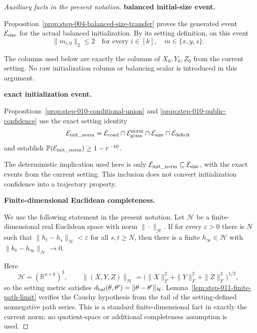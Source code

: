 \begin{proof}[Auxiliary facts in the present notation]


\medskip\noindent\textbf{balanced initial-size event.}\par

Proposition~\ref{prop:step-004-balanced-size-transfer} proves the generated
event \(\mathcal E_{\rm size}\) for the actual balanced initialization. By
its setting definition, on this event
\[
  \|m_{i,0}\|_2\le2
  \quad\text{for every }i\in[k],\quad m\in\{x,y,z\}.
\]

The columns used below are exactly the columns of \(X_0,Y_0,Z_0\) from the
current setting. No raw initialization column or balancing scalar is
introduced in this argument.


\medskip\noindent\textbf{exact initialization event.}\par

Propositions~\ref{prop:step-010-conditional-union} and
\ref{prop:step-010-public-confidence} use the exact setting identity
\[
  \mathcal E_{\rm init\_norm}
  =\mathcal E_{\rm cond}\cap\mathcal E_{\rm gram}^{\rm norm}
   \cap\mathcal E_{\rm size}\cap\mathcal E_{\rm deficit}
\]
and establish \(\mathbb P(\mathcal E_{\rm init\_norm})\ge1-r^{-10}\).

The deterministic implication used
here is only
\(
  \mathcal E_{\rm init\_norm}\subseteq\mathcal E_{\rm size}
\),
with the exact events from the current setting. This inclusion does not
convert initialization confidence into a trajectory property.


\medskip\noindent\textbf{Finite-dimensional Euclidean completeness.}\par

We use the following statement in the present notation. Let \(\mathcal H\) be a finite-dimensional real Euclidean
space with norm \(\|\cdot\|_{\mathcal H}\). If for every \(\varepsilon>0\)
there is \(N\) such that
\(\|h_t-h_s\|_{\mathcal H}<\varepsilon\) for all \(s,t\ge N\), then there is
a finite \(h_\infty\in\mathcal H\) with
\(\|h_t-h_\infty\|_{\mathcal H}\to0\).

Here
\[
  \mathcal H=(\mathbb R^{n\times k})^3,
  \qquad
  \|(X,Y,Z)\|_{\mathcal H}
  =\bigl(\|X\|_F^2+\|Y\|_F^2+\|Z\|_F^2\bigr)^{1/2},
\]
so the setting metric satisfies
\(d_{\rm bal}(\theta,\theta')=\|\theta-\theta'\|_{\mathcal H}\).
Lemma~\ref{lem:step-011-finite-path-limit} verifies the Cauchy hypothesis from
the tail of the setting-defined nonnegative path series. This is a standard
finite-dimensional fact in exactly the current norm; no quotient-space or
additional completeness assumption is used.

\end{proof}



